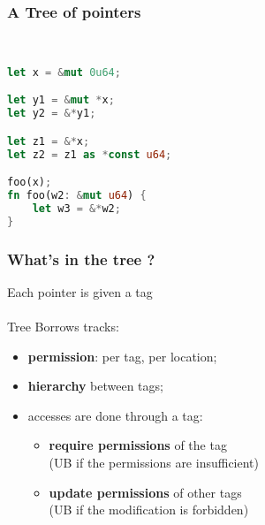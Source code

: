 \begin{frame}[fragile]
    \frametitle{A Tree of pointers}
    \begin{minipage}{0.45\textwidth}
        \begin{block}{}
        \end{block}
    \end{minipage}
    ~\ ~\
    \begin{minipage}{0.45\textwidth}
        \begin{block}{}
            \begin{lstlisting}[language=rust]
let x = &mut 0u64;

let y1 = &mut *x;
let y2 = &*y1;

let z1 = &*x;
let z2 = z1 as *const u64;

foo(x);
fn foo(w2: &mut u64) {
    let w3 = &*w2;
}

            \end{lstlisting}
        \end{block}
    \end{minipage}
\end{frame}

\begin{frame}
    \frametitle{What's in the tree ?}
    Each pointer is given a tag~\\~\\

    Tree Borrows tracks:
    \begin{itemize}
        \item \textbf{permission}: per tag, per location;
        \item \textbf{hierarchy} between tags;
        \item accesses are done through a tag:
            \begin{itemize}
                \item \textbf{require permissions} of the tag\\
                    (UB if the permissions are insufficient)
                \item \textbf{update permissions} of other tags\\
                    (UB if the modification is forbidden)
            \end{itemize}
    \end{itemize}
\end{frame}

